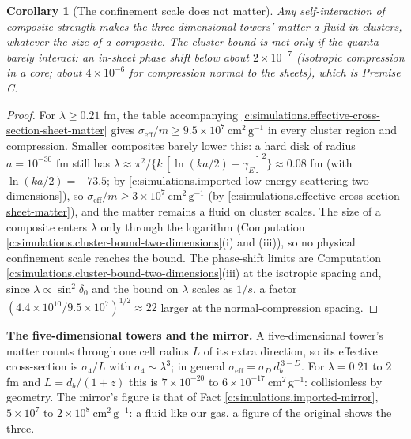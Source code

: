 \documentclass[11pt]{article}
\newtheorem{corollary}[theorem]{Corollary}
\theoremstyle{definition}
\theoremstyle{plain}
\newcommand{\changedmark}[2]{\marginpar{\raggedright\scriptsize\color{#1}#2}}
\providecommand{\cmg}{}\renewcommand{\cmg}{\mathrm{cm^{2}\,g^{-1}}}
\begin{document}
\begin{corollary}[The confinement scale does not matter]\label{c:simulations.confinement-scale-does-not-matter}
\changedmark{gray}{reworded}
Any self-interaction of composite strength makes the three-dimensional towers' matter a fluid in clusters, whatever the size of a composite. The cluster bound is met only if the quanta barely interact: an in-sheet phase shift below about $2 \times 10^{-7}$ (isotropic compression in a core; about $4 \times 10^{-6}$ for compression normal to the sheets), which is Premise C.
\end{corollary}
\begin{proof}
For $\lambda \ge 0.21$ fm, the table accompanying \ref{c:simulations.effective-cross-section-sheet-matter} gives $\sigma_{\mathrm{eff}}/m \ge 9.5 \times 10^{7}\ \cmg$ in every cluster region and compression. Smaller composites barely lower this: a hard disk of radius $a = 10^{-30}$ fm still has $\lambda \approx \pi^{2}/\{k\,[\ln(ka/2) + \gamma_{E}]^{2}\} \approx 0.08$ fm (with $\ln(ka/2) = -73.5$; by \ref{c:simulations.imported-low-energy-scattering-two-dimensions}), so $\sigma_{\mathrm{eff}}/m \ge 3 \times 10^{7}\ \cmg$ (by \ref{c:simulations.effective-cross-section-sheet-matter}), and the matter remains a fluid on cluster scales. The size of a composite enters $\lambda$ only through the logarithm (Computation \ref{c:simulations.cluster-bound-two-dimensions}(i) and (iii)), so no physical confinement scale reaches the bound. The phase-shift limits are Computation \ref{c:simulations.cluster-bound-two-dimensions}(iii) at the isotropic spacing and, since $\lambda \propto \sin^{2}\delta_{0}$ and the bound on $\lambda$ scales as $1/s$, a factor $(4.4 \times 10^{10}/9.5 \times 10^{7})^{1/2} \approx 22$ larger at the normal-compression spacing.

\end{proof}

\label{c:note.simulations.setting-confinement-scale-drops-out-2}
\textbf{The five-dimensional towers and the mirror.} A five-dimensional tower's matter counts through one cell radius $L$ of its extra direction, so its effective cross-section is $\sigma_{4}/L$ with $\sigma_{4} \sim \lambda^{3}$; in general $\sigma_{\mathrm{eff}} = \sigma_{D}\,d_{b}^{\,3-D}$. For $\lambda = 0.21$ to $2$ fm and $L = d_{b}/(1+z)$ this is $7 \times 10^{-20}$ to $6 \times 10^{-17}\ \cmg$: collisionless by geometry. The mirror's figure is that of Fact \ref{c:simulations.imported-mirror}, $5 \times 10^{7}$ to $2 \times 10^{8}\ \cmg$: a fluid like our gas. a figure of the original shows the three.
\end{document}
